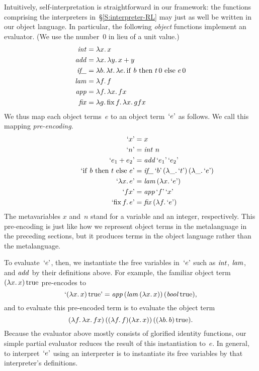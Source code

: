 Intuitively, self\hyp interpretation is straightforward in our
framework: the functions comprising the interpreters
in~\S\ref{S:interpreter-RL} may just as well be written in our object
language.  In particular, the following \emph{object} functions implement an
evaluator.  (We use the number~$0$ in lieu of a unit value.)
\begin{align*}
    \mathinner{\text{\textit{int\/}}} &= \mathopen{\lambda\mathord{x}.\,} x \\
    \mathinner{\text{\textit{add\/}}} &= \mathopen{\lambda\mathord{x}.\,} \mathopen{\lambda\mathord{y}.\,} x+y \\
    \mathinner{\text{\textit{if\_\/}}}&= \mathopen{\lambda\mathord{b}.\,} \mathopen{\lambda\mathord{t}.\,} \mathopen{\lambda\mathord{e}.\,} \mathrm{if\ }b\mathrm{\ then\ }t\,0\mathrm{\ else\ }e\,0 \\
    \mathinner{\text{\textit{lam\/}}} &= \mathopen{\lambda\mathord{f}.\,} f \\
    \mathinner{\text{\textit{app\/}}} &= \mathopen{\lambda\mathord{f}.\,} \mathopen{\lambda\mathord{x}.\,} fx \\
    \mathinner{\text{\textit{fix\/}}} &= \mathopen{\lambda\mathord{g}.\,} \mathopen{\mathrm{fix\,}\mathord{f}.\,} \mathopen{\lambda\mathord{x}.\,} gfx
\end{align*}
We thus map each object terms~$e$ to an object term~$\mathinner{\mathopen{\text{`}}e\mathclose{\text{'}}}$ as follows.
We call this mapping \emph{pre-encoding}.
\begin{align*}
    \encode{x} &= x \\
    \encode{n} &= \ident{int}\, n \\
    \encode{e_1 + e_2} &= \ident{add} \encode{e_1} \encode{e_2} \\
    \encode{\cond{b}{t}{e}} &= \rlap{$\ident{if\_} \encode{b}
        \left(\fun{\_}\encode{t}\right) \left(\fun{\_}\encode{e}\right)$} \\
    \encode{\fun{x}e} &= \ident{lam} (\fun{x} \encode{e}) \\
    \encode{fx} &= \ident{app} \encode{f} \encode{x} \\
    \encode{\fix{f}e} &= \ident{fix} (\fun{f} \encode{e})
\end{align*}
The metavariables $x$ and~$n$ stand for a variable and an integer,
respectively.
This pre-encoding is just like how we represent object terms in the
metalanguage in the preceding sections, but it produces
terms in the object language rather than the metalanguage.

To evaluate~$\mathinner{\mathopen{\text{`}}e\mathclose{\text{'}}}$, then, we
instantiate the free variables in~$\mathinner{\mathopen{\text{`}}e\mathclose{\text{'}}}$ such as $\mathinner{\text{\textit{int\/}}}$,
$\mathinner{\text{\textit{lam\/}}}$, and $\mathinner{\text{\textit{add\/}}}$ by their definitions above.  For
example, the familiar object term $(\mathopen{\lambda\mathord{x}.\,}x)\mathinner{\mathrm{true}}$ pre-encodes to
\begin{equation*}
    \mathinner{\mathopen{\text{`}}(\mathopen{\lambda\mathord{x}.\,}x)\mathinner{\mathrm{true}}\mathclose{\text{'}}} = \mathinner{\text{\textit{app\/}}}
    (\mathinner{\text{\textit{lam\/}}} (\mathopen{\lambda\mathord{x}.\,} x))\, (\mathinner{\text{\textit{bool\/}}} \mathinner{\mathrm{true}}),
\end{equation*}
and to evaluate this pre-encoded term is to evaluate the object term
\begin{equation*}
    (\mathopen{\lambda\mathord{f}.\,} \mathopen{\lambda\mathord{x}.\,} fx) \,
    ((\mathopen{\lambda\mathord{f}.\,} f) (\mathopen{\lambda\mathord{x}.\,} x))\, ((\mathopen{\lambda\mathord{b}.\,} b) \mathinner{\mathrm{true}}).
\end{equation*}
Because the evaluator above mostly consists of glorified identity
functions, our simple partial evaluator reduces the
result of this instantiation to~$e$.  In general, to
interpret~$\mathinner{\mathopen{\text{`}}e\mathclose{\text{'}}}$ using an interpreter is to instantiate its free
variables by that interpreter's definitions.

